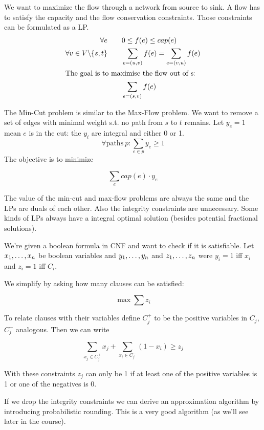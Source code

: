 \begin{itemize}
\begin{Ex} We want to maximize the flow through a network from source to sink. A flow has to satisfy the capacity and the flow conservation constraints. Those constraints can be formulated as a LP.
\begin{align*}
\forall e\qquad & 0\leq f(e)\leq cap(e)\\
\forall v\in V\backslash \{s,t\}\qquad & \sum_{e=(u,v)} f(e) = \sum_{e=(v,u)} f(e)\\
\intertext{The goal is to maximise the flow out of s:}
 &\sum_{e=(s,v)} f(e)
\end{align*}
\end{Ex}

\begin{Ex} The Min-Cut problem is similar to the Max-Flow problem. We want to remove a set of edges with minimal weight s.t. no path from $s$ to $t$ remains. Let $y_e=1$ mean $e$ is in the cut: the $y_i$ are integral and either 0 or 1.
\[\forall \mbox{paths}\ p: \sum_{e\in p} y_e \geq 1\]
The objective is to minimize 

\[\sum_e cap(e)\cdot y_e\]

The value of the min-cut and max-flow problems are always the same and the LPs are duals of each other. Also the integrity constraints are unnecessary. Some kinds of LPs always have a integral optimal solution (besides potential fractional solutions).
\end{Ex}

\begin{Ex}[Satisfiability] We're given a boolean formula in CNF and want to check if it is satisfiable. Let ${x}_1,\ldots,{x}_n$ be boolean variables and ${y}_1,\ldots,{y}_n$ and ${z}_1,\ldots,{z}_n$ were $y_i=1$ iff $x_i$ and $z_i=1$ iff $C_i$.

We simplify by asking how many clauses can be satisfied:

\[\max \sum z_i\]

To relate clauses with their variables define $C_j^+$ to be the positive variables in $C_j$, $C_j^-$ analogous. Then we can write 

\[\sum_{x_j\in C_j^+} x_j + \sum_{x_i \in C_j^-} (1-x_i) \geq z_j\]

With these constraints $z_j$ can only be 1 if at least one of the positive variables is 1 or one of the negatives is 0.

If we drop the integrity constraints we can derive an approximation algorithm by introducing probabilistic rounding. This is a very good algorithm (as we'll see later in the course).
\end{Ex}
\end{itemize}